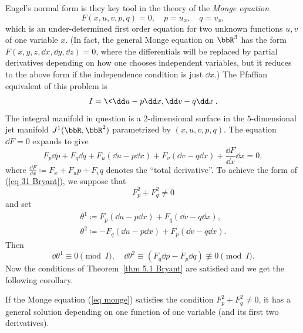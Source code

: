 Engel's normal form is they key tool in the theory of the \emph{Monge equation}
\[F(x,u,v,p,q)=0,\quad p=u_x,\quad q=v_x,\label{eq monge}\]
which is an under-determined first order equation for two unknown functions $u,v$ of one variable $x$. (In fact, the general Monge equation on $\bbR^3$ has the form $F(x,y,z,\dd x,\dd y,\dd z)=0$, where the differentials will be replaced by partial derivatives depending on how one chooses independent variables, but it reduces to the above form if the independence condition is just $\dd x$.) The Pfaffian equivalent of this problem is 
\[I=\<\dd u-p \dd x,\dd v-q\dd x\>.\]
The integral manifold in question is a 2-dimensional surface in the $5$-dimensional jet manifold $J^1(\bbR,\bbR^2)$ parametrized by $(x,u,v,p,q)$. The equation $\dd F=0$ expands to give 
\[F_{p}\dd p+F_q \dd q+F_u(\dd u-p\dd x)+F_v(\dd v-q\dd x)+\frac{\dd F}{\dd x}\dd x=0,\]
where $\frac{\dd F}{\dd x}\coloneqq F_x+F_u p+F_v q$ denotes the ``total derivative''. To achieve the form of (\ref{eq 31 Bryant}), we suppose that 
\[F^2_p +F^2_q\neq 0\]
and set 
\begin{align}
    \theta^1\coloneqq F_p(\dd u-p\dd x)+F_q(\dd v-q \dd x),\\
    \theta^2\coloneqq -F_q(\dd u-p\dd x)+F_p(\dd v-q\dd x).
\end{align}
Then 
\[\dd \theta^1\equiv 0 \pmod{I},\quad \dd\theta^2\equiv (F_q \dd p-F_p \dd q)\not\equiv 0\pmod{I}.\]
Now the conditions of Theorem~\ref{thm 5.1 Bryant} are satisfied and we get the following corollary.

\begin{cor}
    If the Monge equation (\ref{eq monge}) satisfies the condition $F_p^2+F_q^2\neq 0$, it has a general solution depending on one function of one variable (and its first two derivatives).
\end{cor}

